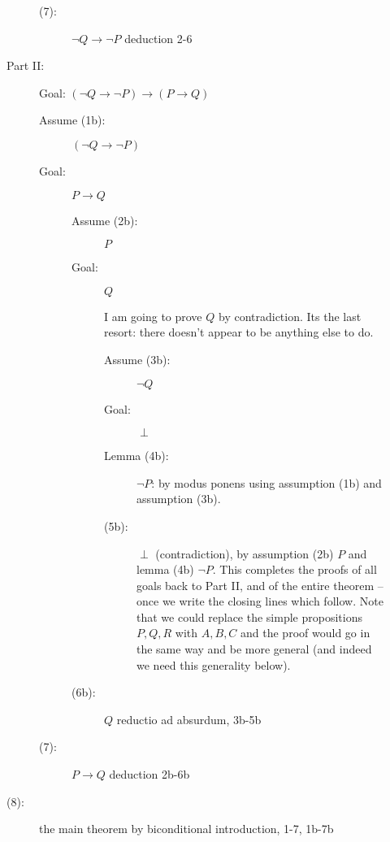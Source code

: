 \documentclass[12pt]{article}
\begin{document}
\begin{description}
\begin{description}
\begin{description}
\begin{description}
\end{description}

\item[(7):]  $\neg Q \rightarrow \neg P$ deduction 2-6

\end{description}



\item[Part II:]  Goal:  $(\neg Q \rightarrow \neg P) \rightarrow (P \rightarrow Q)$

\begin{description}

\item[Assume (1b):]   $(\neg Q \rightarrow \neg P)$

\item[Goal:]  $P \rightarrow Q$

\begin{description}

\item[Assume (2b):]  $P$

\item[Goal:]  $Q$

I am going to prove $Q$ by contradiction.  Its the last resort:
there doesn't appear to be anything else to do.

\begin{description}

\item[Assume (3b):]  $\neg Q$

\item[Goal:]  $\perp$

\item[Lemma (4b):]  $\neg P$:  by modus ponens using assumption (1b) and assumption (3b).

\item[(5b):] $\perp$ (contradiction), by assumption (2b) $P$ and
lemma (4b) $\neg P$.  This completes the proofs of all goals back to
Part II, and of the entire theorem -- once we write the closing lines which follow.  Note that we could replace the simple propositions $P,Q,R$ with
$A,B,C$ and the proof would go in the same way and be more general (and indeed we need this generality below).


\end{description}

\item[(6b):]  $Q$  reductio ad absurdum, 3b-5b

\end{description}

\item[(7):]  $P \rightarrow Q$ deduction 2b-6b

\end{description}

\item[(8):]  the main theorem by biconditional introduction, 1-7, 1b-7b

\end{description}

\end{description}
\end{document}
